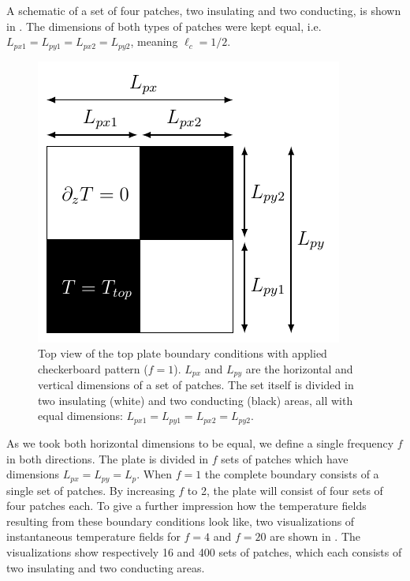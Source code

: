 A schematic of a set of four patches, two insulating and two conducting, is
shown in .  The dimensions of both types of patches were
kept equal, i.e. $L_{px1} = L_{py1} = L_{px2} = L_{py2}$, meaning
$\ell_c=1/2$.

\begin{figure}
\centering
\includegraphics{fig10.pdf}
\caption{%
Top view of the top plate boundary conditions with applied checkerboard
pattern ($f=1$).  $L_{px}$ and $L_{py}$ are the horizontal and vertical
dimensions of a set of patches.  The set itself is divided in two
insulating (white) and two conducting (black) areas, all with equal
dimensions: $L_{px1} = L_{py1} = L_{px2} = L_{py2}$.}
\label{figure12}
\end{figure}

As we took both horizontal dimensions to be equal, we define a single
frequency $f$ in both directions.  The plate is divided in $f$ sets of patches
which have dimensions $L_{px}=L_{py}=L_p$.  When $f=1$ the complete boundary
consists of a single set of patches.  By increasing $f$ to 2, the plate will
consist of four sets of four patches each.  To give a further impression how
the temperature fields resulting from these boundary conditions look like, two
visualizations of instantaneous temperature fields for $f=4$ and $f=20$ are
shown in .  The visualizations show respectively 16 and
400 sets of patches, which each consists of two insulating and two conducting
areas. 

